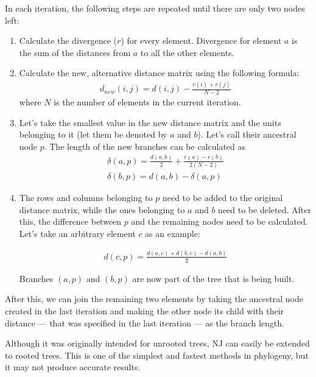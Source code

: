 \documentclass[11pt,twocolumn]{article}
\begin{document}
In each iteration, the following steps are repeated until there are only two nodes left:

\begin{enumerate}
\item Calculate the divergence ($r$) for every element. Divergence for element $a$ is the sum of the distances from $a$ to all the other elements.

\item Calculate the new, alternative distance matrix using the following formula:
\begin{align}
d_{new}(i, j) = d(i, j) - \frac{r(i) + r(j)}{N - 2}
\end{align}
where $N$ is the number of elements in the current iteration.

\item Let's take the smallest value in the new distance matrix and the units belonging to it (let them be denoted by $a$ and $b$). Let's call their ancestral node $p$. The length of the new branches can be calculated as
\begin{align}
\delta(a, p) = \frac{d(a, b)}{2} + \frac{r(a) - r(b)}{2 (N - 2)} \\
\delta(b, p) = d(a, b) - \delta(a, p)
\end{align}

\item The rows and columns belonging to $p$ need to be added to the original distance matrix, while the ones belonging to $a$ and $b$ need to be deleted. After this, the difference between $p$ and the remaining nodes need to be calculated. Let's take an arbitrary element $c$ as an example:

\begin{align}
d(c, p) = \frac{d(a, c) + d(b, c) - d(a, b)}{2}
\end{align}

Branches $(a, p)$ and $(b, p)$ are now part of the tree that is being built.

\end{enumerate}

After this, we can join the remaining two elements by taking the ancestral node created in the last iteration and making the other node its child with their distance — that was specified in the last iteration — as the branch length.

Although it was originally intended for unrooted trees, NJ can easily be extended to rooted trees. This is one of the simplest and fastest methods in phylogeny, but it may not produce accurate results.
\end{document}
